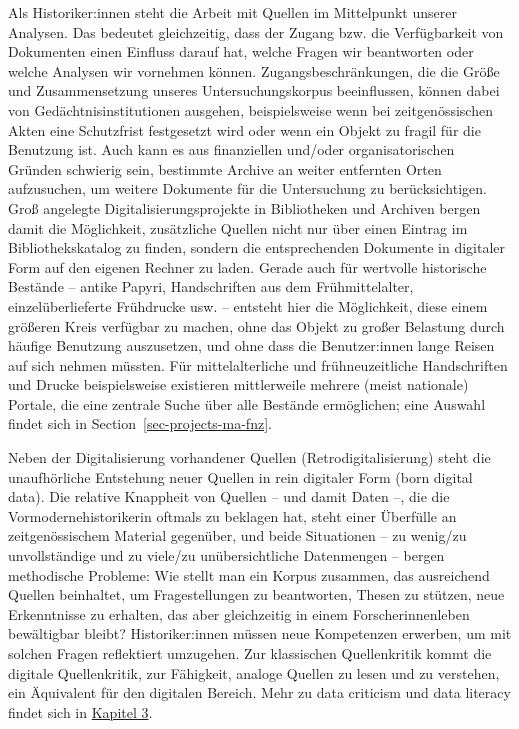 \documentclass[
  letterpaper,
]{book}
\begin{document}
Als Historiker:innen steht die Arbeit mit Quellen im Mittelpunkt unserer
Analysen. Das bedeutet gleichzeitig, dass der Zugang bzw. die
Verfügbarkeit von Dokumenten einen Einfluss darauf hat, welche Fragen
wir beantworten oder welche Analysen wir vornehmen können.
Zugangsbeschränkungen, die die Größe und Zusammensetzung unseres
Untersuchungskorpus beeinflussen, können dabei von
Gedächtnisinstitutionen ausgehen, beispielsweise wenn bei
zeitgenössischen Akten eine Schutzfrist festgesetzt wird oder wenn ein
Objekt zu fragil für die Benutzung ist. Auch kann es aus finanziellen
und/oder organisatorischen Gründen schwierig sein, bestimmte Archive an
weiter entfernten Orten aufzusuchen, um weitere Dokumente für die
Untersuchung zu berücksichtigen. Groß angelegte Digitalisierungsprojekte
in Bibliotheken und Archiven bergen damit die Möglichkeit, zusätzliche
Quellen nicht nur über einen Eintrag im Bibliothekskatalog zu finden,
sondern die entsprechenden Dokumente in digitaler Form auf den eigenen
Rechner zu laden. Gerade auch für wertvolle historische Bestände --
antike Papyri, Handschriften aus dem Frühmittelalter, einzelüberlieferte
Frühdrucke usw. -- entsteht hier die Möglichkeit, diese einem größeren
Kreis verfügbar zu machen, ohne das Objekt zu großer Belastung durch
häufige Benutzung auszusetzen, und ohne dass die Benutzer:innen lange
Reisen auf sich nehmen müssten. Für mittelalterliche und
frühneuzeitliche Handschriften und Drucke beispielsweise existieren
mittlerweile mehrere (meist nationale) Portale, die eine zentrale Suche
über alle Bestände ermöglichen; eine Auswahl findet sich in
Section~\ref{sec-projects-ma-fnz}.

Neben der Digitalisierung vorhandener Quellen (Retrodigitalisierung)
steht die unaufhörliche Entstehung neuer Quellen in rein digitaler Form
(born digital data). Die relative Knappheit von Quellen -- und damit
Daten --, die die Vormodernehistorikerin oftmals zu beklagen hat, steht
einer Überfülle an zeitgenössischem Material gegenüber, und beide
Situationen -- zu wenig/zu unvollständige und zu viele/zu
unübersichtliche Datenmengen -- bergen methodische Probleme: Wie stellt
man ein Korpus zusammen, das ausreichend Quellen beinhaltet, um
Fragestellungen zu beantworten, Thesen zu stützen, neue Erkenntnisse zu
erhalten, das aber gleichzeitig in einem Forscherinnenleben bewältigbar
bleibt? Historiker:innen müssen neue Kompetenzen erwerben, um mit
solchen Fragen reflektiert umzugehen. Zur klassischen Quellenkritik
kommt die digitale Quellenkritik, zur Fähigkeit, analoge Quellen zu
lesen und zu verstehen, ein Äquivalent für den digitalen Bereich. Mehr
zu data criticism und data literacy findet sich in
\protect\hyperlink{digital-literacy-digital-critisicm}{Kapitel 3}.
\end{document}
